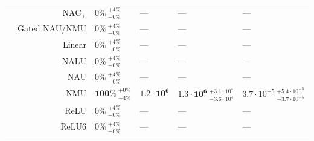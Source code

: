\begin{longtable}{crllll}
\nopagebreak
 & $\mathrm{NAC}_{+}$ & $0\% {~}^{+4\%}_{-0\%}$ & --- & --- & ---\\

\nopagebreak
 & Gated NAU/NMU & $0\% {~}^{+4\%}_{-0\%}$ & --- & --- & ---\\

\nopagebreak
 & Linear & $0\% {~}^{+4\%}_{-0\%}$ & --- & --- & ---\\

\nopagebreak
 & NALU & $0\% {~}^{+4\%}_{-0\%}$ & --- & --- & ---\\

\nopagebreak
 & NAU & $0\% {~}^{+4\%}_{-0\%}$ & --- & --- & ---\\

\nopagebreak
 & NMU & $\mathbf{100\%} {~}^{+0\%}_{-4\%}$ & $\mathbf{1.2 \cdot 10^{6}}$ & $\mathbf{1.3 \cdot 10^{6}} {~}^{+3.1 \cdot 10^{4}}_{-3.6 \cdot 10^{4}}$ & $3.7 \cdot 10^{-5} {~}^{+5.4 \cdot 10^{-5}}_{-3.7 \cdot 10^{-5}}$\\

\nopagebreak
 & ReLU & $0\% {~}^{+4\%}_{-0\%}$ & --- & --- & ---\\

\nopagebreak
\multirow{-11}{*}{\centering\arraybackslash $z^2$} & ReLU6 & $0\% {~}^{+4\%}_{-0\%}$ & --- & --- & ---\\*
\end{longtable}
